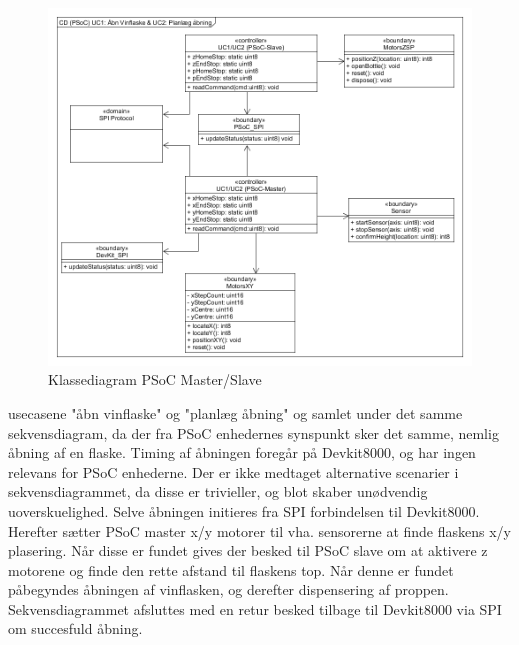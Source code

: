 \begin{figure}[H]
\includegraphics[scale=0.8]{Software/Klassediagram_PSoC}
\caption{Klassediagram PSoC Master/Slave}
\end{figure}

usecasene "åbn vinflaske" og "planlæg åbning" og samlet under det samme sekvensdiagram, da der fra PSoC enhedernes synspunkt sker det samme, nemlig 
åbning af en flaske. Timing af åbningen foregår på Devkit8000, og har ingen relevans for PSoC enhederne. Der er ikke medtaget alternative scenarier i 
sekvensdiagrammet, da disse er trivieller, og blot skaber unødvendig uoverskuelighed. Selve åbningen initieres fra SPI forbindelsen til Devkit8000. Herefter
sætter PSoC master x/y motorer til vha. sensorerne at finde flaskens x/y plasering. Når disse er fundet gives der besked til PSoC slave om at aktivere z motorene
og finde den rette afstand til flaskens top. Når denne er fundet påbegyndes åbningen af vinflasken, og derefter dispensering af proppen. Sekvensdiagrammet
afsluttes med en retur besked tilbage til Devkit8000 via SPI om succesfuld åbning.

